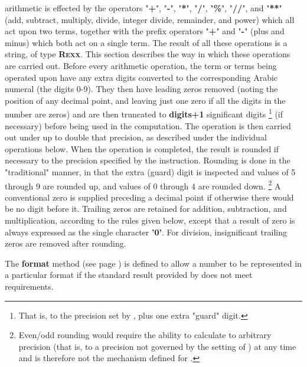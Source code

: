 \nr{} arithmetic is effected by the operators "\textbf{+}",
"\textbf{-}", "\textbf{*}", "\textbf{/}",
"\textbf{\%}", "\textbf{//}", and "\textbf{**}"
(add, subtract, multiply, divide, integer divide, remainder, and power)
which all act upon two terms, together with the prefix operators
"\textbf{+}" and "\textbf{-}" (plus and minus)
which both act on a single term.
The result of all these operations is a \nr{} string, of
type \textbf{R\textsc{exx}}.
This section describes the way in which these operations are carried
out.
 Before every arithmetic operation, the term or terms being operated
upon have any extra digits converted to the corresponding Arabic numeral
(the digits 0-9).  They then have leading zeros removed (noting the
position of any decimal point, and leaving just one zero if all the
digits in the number are zeros) and are then truncated
to \textbf{digits+1} significant digits
\footnote{
That is, to the precision set by , plus one extra
"guard" digit.
}
(if necessary) before being used in the computation.
The operation is then carried out under up to double that precision, as
described under the individual operations below.
When the operation is completed, the result is rounded if necessary to
the precision specified by the  instruction.
 Rounding is done in the "traditional" manner, in that the extra
(guard) digit is inspected and values of 5 through 9 are rounded up,
and values of 0 through 4 are rounded down.
\footnote{
\index{,}
Even/odd rounding would require the ability to calculate to arbitrary
precision (that is, to a precision not governed by the setting of
) at any time and is therefore not the mechanism
defined for \nr{}.
}
 A conventional zero is supplied preceding a decimal point if
otherwise there would be no digit before it.  Trailing zeros are
retained for addition, subtraction, and multiplication, according to
the rules given below, except that a result of zero is always expressed
as the single character \textbf{'0'}.  For division, insignificant
trailing zeros are removed after rounding.
 
The  \textbf{format} method (see page \pageref{refformat})  is defined to allow a
number to be represented in a particular format if the standard result
provided by \nr{} does not meet requirements.
